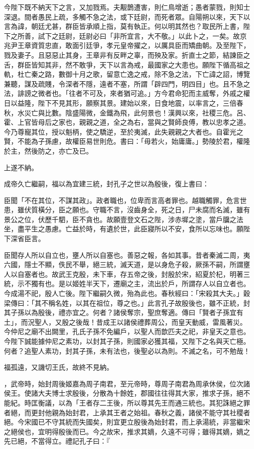 \begin{pinyinscope}
今陛下既不納天下之言，又加戮焉。夫觏鵲遭害，則仁鳥增逝；愚者蒙戮，則知士深退。間者愚民上疏，多觸不急之法，或下廷尉，而死者眾。自陽朔以來，天下以言為諱，朝廷尤甚，群臣皆承順上指，莫有執正。何以明其然也？取民所上書，陛下之所善，試下之廷尉，廷尉必曰「非所宜言，大不敬。」以此卜之，一矣。故京兆尹王章資質忠直，敢面引廷爭，孝元皇帝擢之，以厲具臣而矯曲朝。及至陛下，戮及妻子。且惡惡止其身，王章非有反畔之辜，而殃及家。折直士之節，結諫臣之舌，群臣皆知其非，然不敢爭，天下以言為戒，最國家之大患也。願陛下循高祖之軌，杜亡秦之路，數御十月之歌，留意亡逸之戒，除不急之法，下亡諱之詔，博覽兼聽，謀及疏賤，令深者不隱，遠者不塞，所謂「辟四門，明四目」也。且不急之法，誹謗之微者也。「往者不可及，來者猶可追。」方今君命犯而主威奪，外戚之權日以益隆，陛下不見其形，願察其景。建始以來，日食地震，以率言之，三倍春秋，水災亡與比數。陰盛陽微，金鐵為飛，此何景也！漢興以來，社稷三危。呂、霍、上官皆母后之家也，親親之道，全之為右，當與之賢師良傅，教以忠孝之道。今乃尊寵其位，授以魁柄，使之驕逆，至於夷滅，此失親親之大者也。自霍光之賢，不能為子孫慮，故權臣易世則危。書曰：「毋若火，始庸庸。」勢陵於君，權隆於主，然後防之，亦亡及已。

上遂不納。

成帝久亡繼嗣，福以為宜建三統，封孔子之世以為殷後，復上書曰：

臣聞「不在其位，不謀其政」。政者職也，位卑而言高者罪也。越職觸罪，危言世患，雖伏質橫分，臣之願也。守職不言，沒齒身全，死之日，尸未腐而名滅，雖有景公之位，伏歷千駟，臣不貪也。故願壹登文石之陛，涉赤墀之塗，當戶牖之法坐，盡平生之愚慮。亡益於時，有遺於世，此臣寢所以不安，食所以忘味也。願陛下深省臣言。

臣聞存人所以自立也，壅人所以自塞也。善惡之報，各如其事。昔者秦滅二周，夷六國，隱士不顯，佚民不舉，絕三統，滅天道，是以身危子殺，厥孫不嗣，所謂壅人以自塞者也。故武王克殷，未下車，存五帝之後，封殷於宋，紹夏於杞，明著三統，示不獨有也。是以姬姓半天下，遷廟之主，流出於戶，所謂存人以自立者也。今成湯不祀，殷人亡後。陛下繼嗣久微，殆為此也。春秋經曰：「宋殺其大夫。」穀梁傳曰：「其不稱名姓，以其在祖位，尊之也。」此言孔子故殷後也，雖不正統，封其子孫以為殷後，禮亦宜之。何者？諸侯奪宗，聖庶奪適。傳曰「賢者子孫宜有土」，而況聖人，又殷之後哉！昔成王以諸侯禮葬周公，而皇天動威，雷風著災。今仲尼之廟不出闕里，孔氏子孫不免編戶，以聖人而歆匹夫之祀，非皇天之意也。今陛下誠能據仲尼之素功，以封其子孫，則國家必獲其福，又陛下之名與天亡極。何者？追聖人素功，封其子孫，未有法也，後聖必以為則。不滅之名，可不勉哉！

福孤遠，又譏切王氏，故終不見納。

，武帝時，始封周後姬嘉為周子南君，至元帝時，尊周子南君為周承休侯，位次諸侯王。使諸大夫博士求殷後，分散為十餘姓，郡國往往得其大家，推求子孫，絕不能紀。時匡衡議，以為「王者存二王後，所以尊其先王而通三統也。其犯誅絕之罪者絕，而更封他親為始封君，上承其王者之始祖。春秋之義，諸侯不能守其社稷者絕。今宋國已不守其統而失國矣，則宜更立殷後為始封君，而上承湯統，非當繼宋之絕侯也，宜明得殷後而已。今之故宋，推求其嫡，久遠不可得；雖得其嫡，嫡之先已絕，不當得立。禮記孔子曰：『


\end{pinyinscope}
